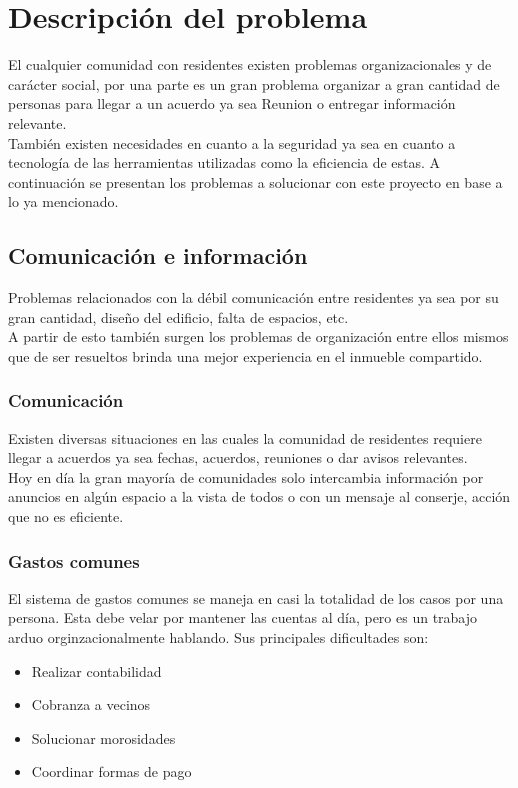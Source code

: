 \chapter{Descripción del problema}
\label{chap:problem}
El cualquier comunidad con residentes existen problemas organizacionales y de carácter social, por una parte es un gran problema organizar a gran cantidad de personas para llegar a un acuerdo ya sea Reunion o entregar información relevante.\\
También existen necesidades en cuanto a la seguridad ya sea en cuanto a tecnología de las herramientas utilizadas como la eficiencia de estas. A continuación se presentan los problemas a solucionar con este proyecto en base a lo ya mencionado.
\section{Comunicación e información}
Problemas relacionados con la débil comunicación entre residentes ya sea por su gran cantidad, diseño del edificio, falta de espacios, etc.\\
A partir de esto también surgen los problemas de organización entre ellos mismos que de ser resueltos brinda una mejor experiencia en el inmueble compartido.
\subsection{Comunicación}
Existen diversas situaciones en las cuales la comunidad de residentes requiere llegar a acuerdos ya sea fechas, acuerdos, reuniones o dar avisos relevantes.\\
Hoy en día la gran mayoría de comunidades solo intercambia información por anuncios en algún espacio a la vista de todos o con un mensaje al conserje, acción que no es eficiente.
\subsection{Gastos comunes}
El sistema de gastos comunes se maneja en casi la totalidad de los casos por una persona. Esta debe velar por mantener las cuentas al día, pero es un trabajo arduo orginzacionalmente hablando. Sus principales dificultades son:
\begin{itemize}
	\item Realizar contabilidad
	\item Cobranza a vecinos
	\item Solucionar morosidades
	\item Coordinar formas de pago 
\end{itemize}
